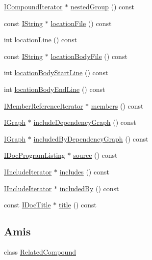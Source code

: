 \begin{DoxyCompactItemize}
\hyperlink{class_i_compound_iterator}{I\+Compound\+Iterator} $\ast$ \hyperlink{class_compound_handler_afce3e49fbdb6c8a5b7938d7c7f838890}{nested\+Group} () const 
\item 
const \hyperlink{class_i_string}{I\+String} $\ast$ \hyperlink{class_compound_handler_a86900c41b203fcca29b90b6b5bc15a03}{location\+File} () const 
\item 
int \hyperlink{class_compound_handler_a570af62e127dadb39a58ca081335e47f}{location\+Line} () const 
\item 
const \hyperlink{class_i_string}{I\+String} $\ast$ \hyperlink{class_compound_handler_a84c25c4970e297a0ffc16204c273d9f9}{location\+Body\+File} () const 
\item 
int \hyperlink{class_compound_handler_a7188b9bdd00ac5f68c26af66576e0012}{location\+Body\+Start\+Line} () const 
\item 
int \hyperlink{class_compound_handler_a164ae257fad3fd07dde37e84998ea392}{location\+Body\+End\+Line} () const 
\item 
\hyperlink{class_i_member_reference_iterator}{I\+Member\+Reference\+Iterator} $\ast$ \hyperlink{class_compound_handler_a8dcdb9ab9a28c7a1215e0517883ac1a0}{members} () const 
\item 
\hyperlink{class_i_graph}{I\+Graph} $\ast$ \hyperlink{class_compound_handler_ae7de2a2aa1211e908a69da67d0537696}{include\+Dependency\+Graph} () const 
\item 
\hyperlink{class_i_graph}{I\+Graph} $\ast$ \hyperlink{class_compound_handler_a5da657b3eb4993ff2a9cd17672dee838}{included\+By\+Dependency\+Graph} () const 
\item 
\hyperlink{class_i_doc_program_listing}{I\+Doc\+Program\+Listing} $\ast$ \hyperlink{class_compound_handler_adbf921d7f3b5558d6d6645984e220881}{source} () const 
\item 
\hyperlink{class_i_include_iterator}{I\+Include\+Iterator} $\ast$ \hyperlink{class_compound_handler_ac8d09f83d7241e3587789fa30bc7365e}{includes} () const 
\item 
\hyperlink{class_i_include_iterator}{I\+Include\+Iterator} $\ast$ \hyperlink{class_compound_handler_a90766ae5ee08f27264f8de3db67b8d98}{included\+By} () const 
\item 
const \hyperlink{class_i_doc_title}{I\+Doc\+Title} $\ast$ \hyperlink{class_compound_handler_aee151fb750e74778c38272829e4535f2}{title} () const 
\end{DoxyCompactItemize}
\subsection*{Amis}
\begin{DoxyCompactItemize}
\item 
class \hyperlink{class_compound_handler_a3ac82494777760c5bf9d85209ba95321}{Related\+Compound}
\end{DoxyCompactItemize}

